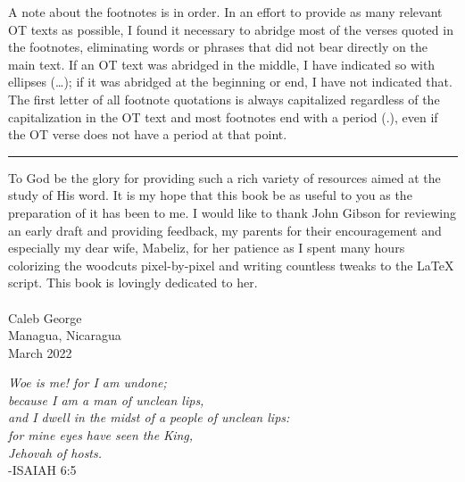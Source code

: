 A note about the footnotes is in order. In an effort to provide as many relevant OT texts as possible, I found it necessary to abridge most of the verses quoted in the footnotes, eliminating words or phrases that did not bear directly on the main text. If an OT text was abridged in the middle, I have indicated so with ellipses (\ldots); if it was abridged at the beginning or end, I have not indicated that. The first letter of all footnote quotations is always capitalized regardless of the capitalization in the OT text and most footnotes end with a period (.), even if the OT verse does not have a period at that point.
\fancybreak{ * * *}
To God be the glory for providing such a rich variety of resources aimed at the study of His word. It is my hope that this book be as useful to you as the preparation of it has been to me. I would like to thank John Gibson for reviewing an early draft and providing feedback, my parents for their encouragement and especially my dear wife, Mabeliz, for her patience as I spent many hours colorizing the woodcuts pixel-by-pixel and writing countless tweaks to the \LaTeX{} script. This book is lovingly dedicated to her.\\
\\
Caleb George\\
Managua, Nicaragua\\
March 2022
\clearpage
\ClearShipoutPicture
\cleartorecto
\begin{vplace}
\begin{center}
\textit{
Woe is me! for I am undone; \\
because I am a man of unclean lips, \\
and I dwell in the midst of a people of unclean lips: \\
for mine eyes have seen the King, \\
Jehovah of hosts.} \\
-ISAIAH 6:5
\end{center}
\end{vplace}

